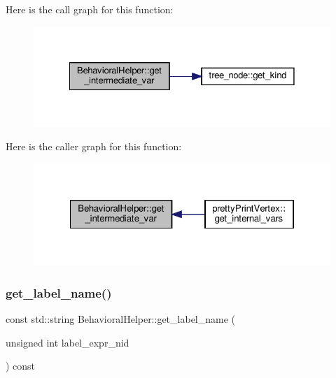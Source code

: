Here is the call graph for this function\+:
\nopagebreak
\begin{figure}[H]
\begin{center}
\leavevmode
\includegraphics[width=328pt]{dd/db2/classBehavioralHelper_a391009a10b8b6ff6ca10168f19a2a56d_cgraph}
\end{center}
\end{figure}
Here is the caller graph for this function\+:
\nopagebreak
\begin{figure}[H]
\begin{center}
\leavevmode
\includegraphics[width=322pt]{dd/db2/classBehavioralHelper_a391009a10b8b6ff6ca10168f19a2a56d_icgraph}
\end{center}
\end{figure}
\mbox{\label{classBehavioralHelper_a28996a23af481bdf84e16fe884a596ff}} 
\subsubsection{\texorpdfstring{get\+\_\+label\+\_\+name()}{get\_label\_name()}}
{\footnotesize\ttfamily const std\+::string Behavioral\+Helper\+::get\+\_\+label\+\_\+name (\begin{DoxyParamCaption}\item[{unsigned int}]{label\+\_\+expr\+\_\+nid }\end{DoxyParamCaption}) const\hspace{0.3cm}{\ttfamily [virtual]}}



